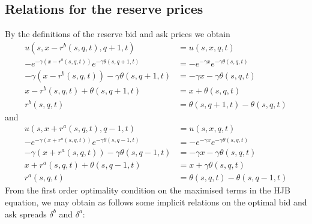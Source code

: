 \subsection*{Relations for the reserve prices}
By the definitions of the reserve bid and ask prices we obtain
\begin{align*}
    u(s,x-r^b(s,q,t),q+1,t)&=u(s,x,q,t)\\
    -e^{-\gamma(x-r^b(s,q,t))}e^{-\gamma\theta(s,q+1,t)}&=-e^{-\gamma x}e^{-\gamma\theta(s,q,t)}\\
    -\gamma(x-r^b(s,q,t))-\gamma\theta(s,q+1,t)&=-\gamma x-\gamma\theta(s,q,t)\\
    x-r^b(s,q,t)+\theta(s,q+1,t)&=x+\theta(s,q,t)\\
    r^b(s,q,t)&=\theta(s,q+1,t)-\theta(s,q,t)
\end{align*}
and
\begin{align*}
    u(s,x+r^a(s,q,t),q-1,t)&=u(s,x,q,t)\\
    -e^{-\gamma(x+r^a(s,q,t))}e^{-\gamma\theta(s,q-1,t)}&=-e^{-\gamma x}e^{-\gamma\theta(s,q,t)}\\
    -\gamma(x+r^a(s,q,t))-\gamma\theta(s,q-1,t)&=-\gamma x-\gamma\theta(s,q,t)\\
    x+r^a(s,q,t)+\theta(s,q-1,t)&=x+\gamma\theta(s,q,t)\\
    r^a(s,q,t)&=\theta(s,q,t)-\theta(s,q-1,t)
\end{align*}
From the first order optimality condition on the maximised terms in the HJB equation, we may obtain as follows some implicit relations
on the optimal bid and ask spreads $\delta^b$ and $\delta^a$:
